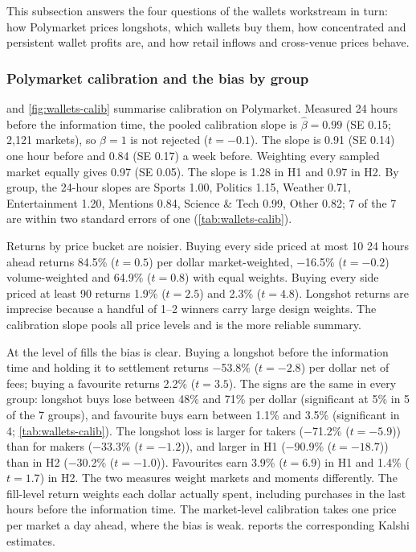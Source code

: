 This subsection answers the four questions of the wallets workstream in turn: how Polymarket prices
longshots, which wallets buy them, how concentrated and persistent wallet profits are, and how
retail inflows and cross-venue prices behave.

\subsubsection{Polymarket calibration and the bias by group}\label{sec:res-wallets-calib}

 and \cref{fig:wallets-calib} summarise calibration on Polymarket. Measured 24 hours before the
information time, the pooled calibration slope is $\hat\beta=0.99$ (SE 0.15; 2{,}121
markets), so $\beta=1$ is not rejected ($t=-0.1$). The slope is 0.91 (SE 0.14) one hour
before and 0.84 (SE 0.17) a week before. Weighting every sampled market equally gives
0.97 (SE 0.05). The slope is 1.28 in H1 and 0.97 in H2. By group, the 24-hour
slopes are Sports 1.00, Politics 1.15, Weather 0.71, Entertainment 1.20, Mentions 0.84, Science \& Tech 0.99, Other 0.82; 7 of the 7 are within two standard errors of one (\cref{tab:wallets-calib}).

Returns by price bucket are noisier. Buying every side priced at most 10\cents{} 24 hours
ahead returns 84.5\% ($t=0.5$) per dollar market-weighted, $-$16.5\% ($t=-0.2$) volume-weighted and 64.9\% ($t=0.8$) with equal weights. Buying
every side priced at least 90\cents{} returns 1.9\% ($t=2.5$) and 2.3\% ($t=4.8$). Longshot returns are imprecise because a
handful of 1--2\cents{} winners carry large design weights. The calibration slope pools all price levels and is the
more reliable summary.

At the level of fills the bias is clear. Buying a longshot before the information time and holding it to
settlement returns $-$53.8\% ($t=-2.8$) per dollar net of fees; buying a favourite returns 2.2\% ($t=3.5$). The signs are the
same in every group: longshot buys lose between 48\% and 71\% per dollar (significant at
5\% in 5 of the 7 groups), and favourite buys earn between 1.1\% and 3.5\%
(significant in 4; \cref{tab:wallets-calib}). The longshot loss is larger for takers ($-$71.2\% ($t=-5.9$)) than for
makers ($-$33.3\% ($t=-1.2$)), and larger in H1 ($-$90.9\% ($t=-18.7$)) than in H2 ($-$30.2\% ($t=-1.0$)). Favourites earn 3.9\% ($t=6.9$) in H1 and
1.4\% ($t=1.7$) in H2. The two measures weight markets and moments differently. The fill-level return weights each
dollar actually spent, including purchases in the last hours before the information time. The market-level
calibration takes one price per market a day ahead, where the bias is weak.  reports
the corresponding Kalshi estimates.

